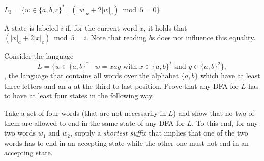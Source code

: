 \documentclass{exercise}
\begin{document}
\subtask $L_3=\{ w\in\{a,b,c\}^* \mid (|w|_a+2|w|_c)\bmod 5 = 0 \}$.

  \begin{solution}
    A state is labeled $i$ if, for the current word $x$, it holds that
    $(|x|_a+2|x|_c)\bmod 5 = i$.  Note that reading $b$s does not
    influence this equality.
    \begin{center}
    \end{center}
  \end{solution}


Consider the language
\[ L = \{ w\in\{a,b\}^* \mid w=xay \text{ with } x\in\{a,b\}^* \text{ and } y\in\{a,b\}^2\}, \]
\ie, the language that contains all words over the alphabet $\{a,b\}$ which
have at least three letters and an $a$ at the third-to-last position.  Prove
that any DFA for $L$ has to have at least four states in the following way.

Take a set of four words (that are not necessarily in $L$) and show that no two
of them are allowed to end in the same state of any DFA for $L$.  To this end, for
any two words $w_1$ and $w_2$, supply a \emph{shortest suffix} that implies that
one of the two words has to end in an accepting state while the other one must
not end in an accepting state. 
\end{document}
